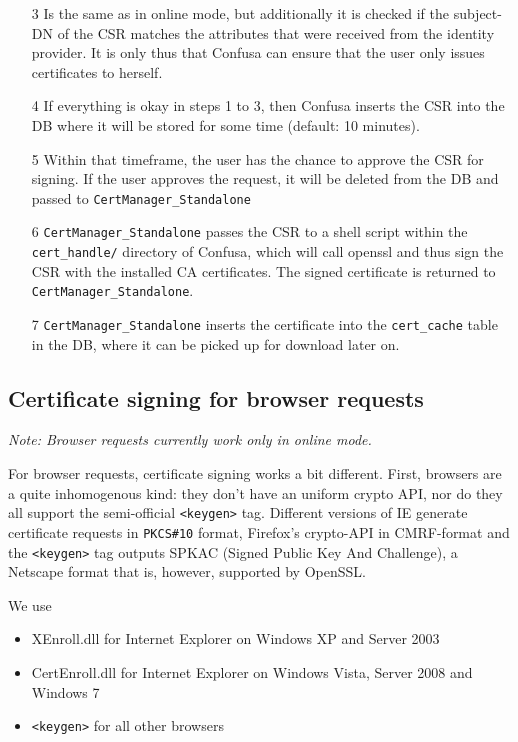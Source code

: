 \documentclass{scrartcl}
\begin{document}
\begin{enumerate}
	\item[3] Is the same as in online mode, but additionally it is checked if the subject-DN of the CSR matches the attributes that were received from the identity provider. It is only thus that Confusa can ensure that the user only issues certificates to herself.
	\item[4] If everything is okay in steps 1 to 3, then Confusa inserts the CSR into the DB where it will be stored for some time (default: 10 minutes).
	\item[5] Within that timeframe, the user has the chance to approve the CSR for signing. If the user approves the request, it will be deleted from the DB and passed to \verb+CertManager_Standalone+
	\item[6] \verb+CertManager_Standalone+ passes the CSR to a shell script within the \verb+cert_handle/+ directory of Confusa, which will call openssl and thus sign the CSR with the installed CA certificates. The signed certificate is returned to \verb+CertManager_Standalone+.
	\item[7] \verb+CertManager_Standalone+ inserts the certificate into the \verb+cert_cache+ table in the DB, where it can be picked up for download later on.
\end{enumerate}

\subsection{Certificate signing for browser requests}

\emph{Note: Browser requests currently work only in online mode.}

For browser requests, certificate signing works a bit different. First, browsers are a quite inhomogenous kind: they don't have an uniform crypto API, nor do they all support the semi-official \verb+<keygen>+ tag. Different versions of IE generate certificate requests in \verb+PKCS#10+ format, Firefox's crypto-API in CMRF-format and the \verb+<keygen>+ tag outputs SPKAC (Signed Public Key And Challenge), a Netscape format that is, however, supported by OpenSSL.

We use

\begin{itemize}
	\item XEnroll.dll for Internet Explorer on Windows XP and Server 2003
	\item CertEnroll.dll for Internet Explorer on Windows Vista, Server 2008 and Windows 7
	\item \verb+<keygen>+ for all other browsers
\end{itemize}
\end{document}
